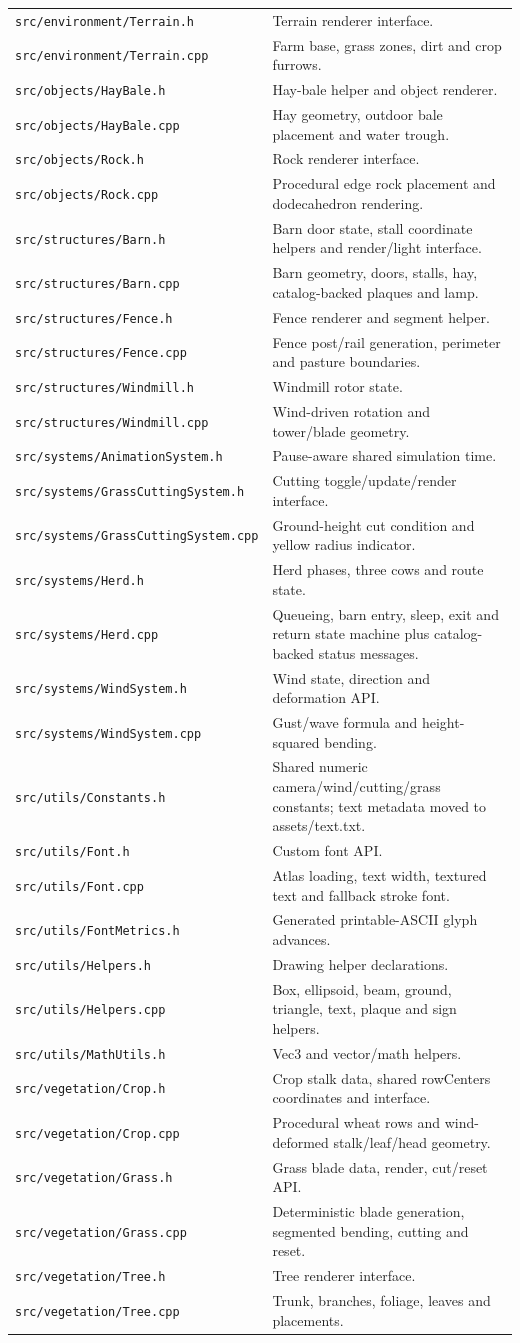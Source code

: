 \documentclass[11pt,a4paper,openany]{book}
\newcommand{\file}[1]{\nolinkurl{#1}}
\newcommand{\pathrow}[2]{\file{#1} & #2\\}
\begin{document}
\begin{longtable}{@{}p{}p{}@{}}
	\pathrow{src/environment/Terrain.h}{Terrain renderer interface.}
	\pathrow{src/environment/Terrain.cpp}{Farm base, grass zones, dirt and crop furrows.}
	\pathrow{src/objects/HayBale.h}{Hay-bale helper and object renderer.}
	\pathrow{src/objects/HayBale.cpp}{Hay geometry, outdoor bale placement and water trough.}
	\pathrow{src/objects/Rock.h}{Rock renderer interface.}
	\pathrow{src/objects/Rock.cpp}{Procedural edge rock placement and dodecahedron rendering.}
	\pathrow{src/structures/Barn.h}{Barn door state, stall coordinate helpers and render/light interface.}
	\pathrow{src/structures/Barn.cpp}{Barn geometry, doors, stalls, hay, catalog-backed plaques and lamp.}
	\pathrow{src/structures/Fence.h}{Fence renderer and segment helper.}
	\pathrow{src/structures/Fence.cpp}{Fence post/rail generation, perimeter and pasture boundaries.}
	\pathrow{src/structures/Windmill.h}{Windmill rotor state.}
	\pathrow{src/structures/Windmill.cpp}{Wind-driven rotation and tower/blade geometry.}
	\pathrow{src/systems/AnimationSystem.h}{Pause-aware shared simulation time.}
	\pathrow{src/systems/GrassCuttingSystem.h}{Cutting toggle/update/render interface.}
	\pathrow{src/systems/GrassCuttingSystem.cpp}{Ground-height cut condition and yellow radius indicator.}
	\pathrow{src/systems/Herd.h}{Herd phases, three cows and route state.}
	\pathrow{src/systems/Herd.cpp}{Queueing, barn entry, sleep, exit and return state machine plus catalog-backed status messages.}
	\pathrow{src/systems/WindSystem.h}{Wind state, direction and deformation API.}
	\pathrow{src/systems/WindSystem.cpp}{Gust/wave formula and height-squared bending.}
	\pathrow{src/utils/Constants.h}{Shared numeric camera/wind/cutting/grass constants; text metadata moved to assets/text.txt.}
	\pathrow{src/utils/Font.h}{Custom font API.}
	\pathrow{src/utils/Font.cpp}{Atlas loading, text width, textured text and fallback stroke font.}
	\pathrow{src/utils/FontMetrics.h}{Generated printable-ASCII glyph advances.}
	\pathrow{src/utils/Helpers.h}{Drawing helper declarations.}
	\pathrow{src/utils/Helpers.cpp}{Box, ellipsoid, beam, ground, triangle, text, plaque and sign helpers.}
	\pathrow{src/utils/MathUtils.h}{Vec3 and vector/math helpers.}
	\pathrow{src/vegetation/Crop.h}{Crop stalk data, shared rowCenters coordinates and interface.}
	\pathrow{src/vegetation/Crop.cpp}{Procedural wheat rows and wind-deformed stalk/leaf/head geometry.}
	\pathrow{src/vegetation/Grass.h}{Grass blade data, render, cut/reset API.}
	\pathrow{src/vegetation/Grass.cpp}{Deterministic blade generation, segmented bending, cutting and reset.}
	\pathrow{src/vegetation/Tree.h}{Tree renderer interface.}
	\pathrow{src/vegetation/Tree.cpp}{Trunk, branches, foliage, leaves and placements.}
	\bottomrule
\end{longtable}
\end{document}
